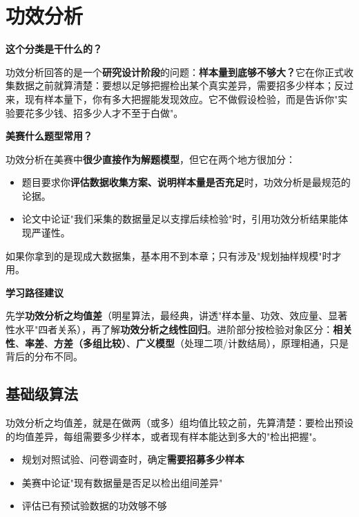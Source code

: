 \chapter{功效分析}

\begin{chapteroverview}
\textbf{这个分类是干什么的？}

功效分析回答的是一个\textbf{研究设计阶段}的问题：\textbf{样本量到底够不够大？}它在你正式收集数据之前就算清楚：要想以足够把握检出某个真实差异，需要招多少样本；反过来，现有样本量下，你有多大把握能发现效应。它不做假设检验，而是告诉你"实验要花多少钱、招多少人才不至于白做"。

\textbf{美赛什么题型常用？}

功效分析在美赛中\textbf{很少直接作为解题模型}，但它在两个地方很加分：
\begin{itemize}
    \item 题目要求你\textbf{评估数据收集方案、说明样本量是否充足}时，功效分析是最规范的论据。
    \item 论文中论证"我们采集的数据量足以支撑后续检验"时，引用功效分析结果能体现严谨性。
\end{itemize}
如果你拿到的是现成大数据集，基本用不到本章；只有涉及"规划抽样规模"时才用。

\textbf{学习路径建议}

先学\textbf{功效分析之均值差}（明星算法，最经典，讲透"样本量、功效、效应量、显著性水平"四者关系），再了解\textbf{功效分析之线性回归}。进阶部分按检验对象区分：\textbf{相关性}、\textbf{率差}、\textbf{方差（多组比较）}、\textbf{广义模型}（处理二项/计数结局），原理相通，只是背后的分布不同。
\end{chapteroverview}

\section{基础级算法}


\begin{algointro}
功效分析之均值差，就是在做两（或多）组均值比较之前，先算清楚：要检出预设的均值差异，每组需要多少样本，或者现有样本能达到多大的"检出把握"。
\end{algointro}

\begin{algoscene}
\begin{itemize}
    \item 规划对照试验、问卷调查时，确定\textbf{需要招募多少样本}
    \item 美赛中论证"现有数据量是否足以检出组间差异"
    \item 评估已有预试验数据的功效够不够
\end{itemize}
\end{algoscene}

